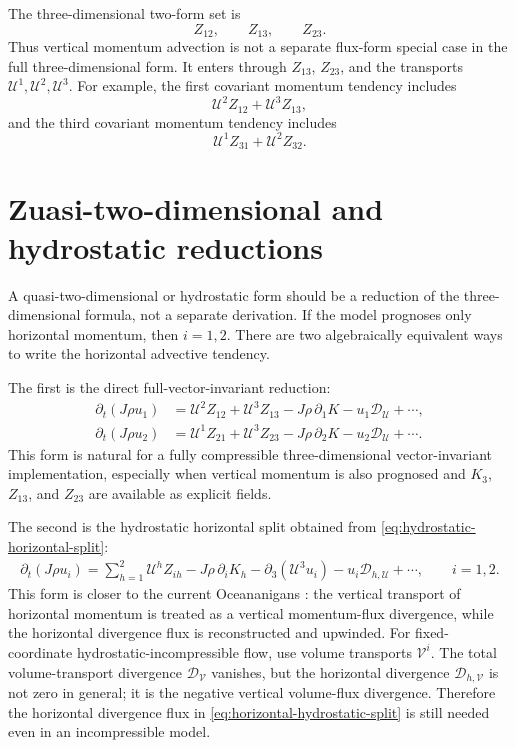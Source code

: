 \documentclass[11pt]{article}
\newcommand{\pd}{\partial}
\newcommand{\mc}[1]{\mathcal{#1}}
\newcommand{\code}[1]{\texttt{\detokenize{#1}}}
\newcommand{\Div}{\mc{D}}
\newcommand{\Vflux}{\mc{V}}
\newcommand{\Uflux}{\mc{U}}
\newcommand{\Dvol}{\Div_{\Vflux}}
\newcommand{\Dmass}{\Div_{\Uflux}}
\newcommand{\Dhvol}{\Div_{h,\Vflux}}
\newcommand{\Dhmass}{\Div_{h,\Uflux}}
\begin{document}
The three-dimensional two-form set is
\begin{equation}
  Z_{12},\qquad Z_{13},\qquad Z_{23}.
\end{equation}
Thus vertical momentum advection is not a separate flux-form special case in the full three-dimensional form.  It enters through \(Z_{13}\), \(Z_{23}\), and the transports \(\Uflux^1,\Uflux^2,\Uflux^3\).  For example, the first covariant momentum tendency includes
\begin{equation}
  \Uflux^2 Z_{12} + \Uflux^3 Z_{13},
\end{equation}
and the third covariant momentum tendency includes
\begin{equation}
  \Uflux^1 Z_{31} + \Uflux^2 Z_{32}.
\end{equation}

\section{Zuasi-two-dimensional and hydrostatic reductions}
\label{sec:quasi-2d}

A quasi-two-dimensional or hydrostatic form should be a reduction of the three-dimensional formula, not a separate derivation.  If the model prognoses only horizontal momentum, then \(i=1,2\).  There are two algebraically equivalent ways to write the horizontal advective tendency.

The first is the direct full-vector-invariant reduction:
\begin{align}
  \pd_t(J\rho u_1)
  &= \Uflux^2 Z_{12} + \Uflux^3 Z_{13}
     - J\rho\,\pd_1 K - u_1 \Dmass + \cdots, \\
  \pd_t(J\rho u_2)
  &= \Uflux^1 Z_{21} + \Uflux^3 Z_{23}
     - J\rho\,\pd_2 K - u_2 \Dmass + \cdots.
  \label{eq:horizontal-full-vi}
\end{align}
This form is natural for a fully compressible three-dimensional vector-invariant implementation, especially when vertical momentum is also prognosed and \(K_3\), \(Z_{13}\), and \(Z_{23}\) are available as explicit fields.

The second is the hydrostatic horizontal split obtained from \eqref{eq:hydrostatic-horizontal-split}:
\begin{align}
  \pd_t(J\rho u_i)
  = \sum_{h=1}^2 \Uflux^h Z_{ih}
    - J\rho\,\pd_i K_h
    - \pd_3(\Uflux^3u_i)
    - u_i\Dhmass
    + \cdots,
  \qquad i=1,2.
  \label{eq:horizontal-hydrostatic-split}
\end{align}
This form is closer to the current Oceananigans \code{WENOVectorInvariant}: the vertical transport of horizontal momentum is treated as a vertical momentum-flux divergence, while the horizontal divergence flux is reconstructed and upwinded.  For fixed-coordinate hydrostatic-incompressible flow, use volume transports \(\Vflux^i\).  The total volume-transport divergence \(\Dvol\) vanishes, but the horizontal divergence \(\Dhvol\) is not zero in general; it is the negative vertical volume-flux divergence.  Therefore the horizontal divergence flux in \eqref{eq:horizontal-hydrostatic-split} is still needed even in an incompressible model.
\end{document}
